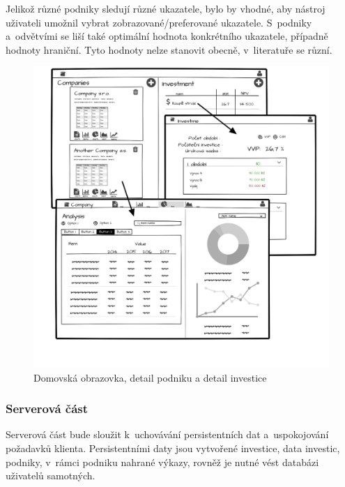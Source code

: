 Jelikož různé podniky sledují různé ukazatele, bylo by vhodné, aby nástroj uživateli umožnil vybrat zobrazované/preferované ukazatele. S~podniky a~odvětvími se liší také optimální hodnota konkrétního ukazatele, případně hodnoty hraniční. Tyto hodnoty nelze stanovit obecně, v~literatuře se různí.


\begin{figure}
  \centering
  \includegraphics[width=14cm]{img/gui_mockup.png}
  \caption{Domovská obrazovka, detail podniku a detail investice}
\end{figure}

\subsubsection{Serverová část}
Serverová část bude sloužit k~uchovávání persistentních dat a~uspokojování požadavků klienta. Persistentními daty jsou vytvořené investice, data investic, podniky, v~rámci podniku nahrané výkazy, rovněž je nutné vést databázi uživatelů samotných.


